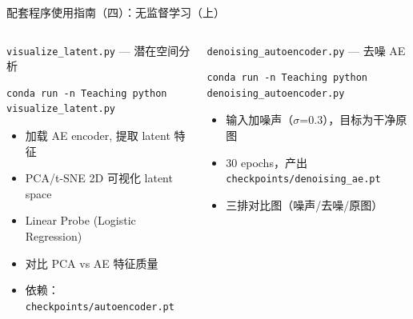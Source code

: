\documentclass[aspectratio=169]{ctexbeamer}
\begin{document}
\begin{frame}[fragile,shrink=15]{配套程序使用指南（四）：无监督学习（上）}
\begin{columns}[T]
\begin{block}{\texttt{visualize\_latent.py} — 潜在空间分析}
\begin{lstlisting}[basicstyle=\ttfamily\scriptsize, frame=none, numbers=none, backgroundcolor=\color{codebg}]
conda run -n Teaching python visualize_latent.py
\end{lstlisting}
\vspace{-0.35cm}
\begin{itemize}
  \item 加载 AE encoder, 提取 latent 特征
  \item PCA/t-SNE 2D 可视化 latent space
  \item Linear Probe (Logistic Regression)
  \item 对比 PCA vs AE 特征质量
  \item 依赖：\texttt{checkpoints/autoencoder.pt}
\end{itemize}
\end{block}

\vspace{0.05cm}

\begin{block}{\texttt{denoising\_autoencoder.py} — 去噪 AE}
\begin{lstlisting}[basicstyle=\ttfamily\scriptsize, frame=none, numbers=none, backgroundcolor=\color{codebg}]
conda run -n Teaching python denoising_autoencoder.py
\end{lstlisting}
\vspace{-0.35cm}
\begin{itemize}
  \item 输入加噪声（$\sigma$=0.3），目标为干净原图
  \item 30 epochs，产出 \texttt{checkpoints/denoising\_ae.pt}
  \item 三排对比图（噪声/去噪/原图）
\end{itemize}
\end{block}
\end{columns}
\end{frame}
\end{document}
